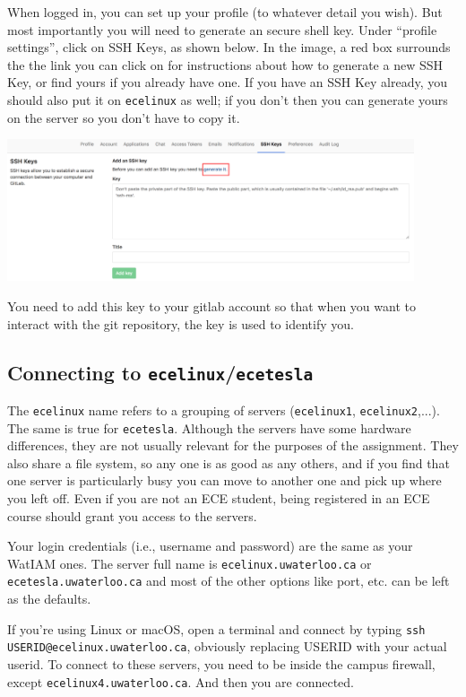 \documentclass[letterpaper,10pt]{article}
\begin{document}
When logged in, you can set up your profile (to whatever detail you wish). But most importantly you will need to generate an secure shell key. Under ``profile settings'', click on SSH Keys, as shown below. In the image, a red box surrounds the the link you can click on for instructions about how to generate a new SSH Key, or find yours if you already have one. If you have an SSH Key already, you should also put it on \texttt{ecelinux} as well; if you don't then you can generate yours on the server so you don't have to copy it.

\begin{center}
	\includegraphics[width=0.9\textwidth]{images/gitlab-sshkey.png}
\end{center}

You need to add this key to your gitlab account so that when you want to interact with the git repository, the key is used to identify you.

\subsection*{Connecting to \texttt{ecelinux}/\texttt{ecetesla}}

The \texttt{ecelinux} name refers to a grouping of servers (\texttt{ecelinux1}, \texttt{ecelinux2},...). The same is true for \texttt{ecetesla}. Although the servers have some hardware differences, they are not usually relevant for the purposes of the assignment. They also share a file system, so any one is as good as any others, and if you find that one server is particularly busy you can move to another one and pick up where you left off. Even if you are not an ECE student, being registered in an ECE course should grant you access to the servers.

Your login credentials (i.e., username and password) are the same as your WatIAM ones. The server full name is \texttt{ecelinux.uwaterloo.ca} or \texttt{ecetesla.uwaterloo.ca} and most of the other options like port, etc. can be left as the defaults. 

If you're using Linux or macOS, open a terminal and connect by typing \texttt{ssh USERID@ecelinux.uwaterloo.ca}, obviously replacing USERID with your actual userid. To connect to these servers, you need to be inside the campus firewall, except \texttt{ecelinux4.uwaterloo.ca}. And then you are connected. 
\end{document}
